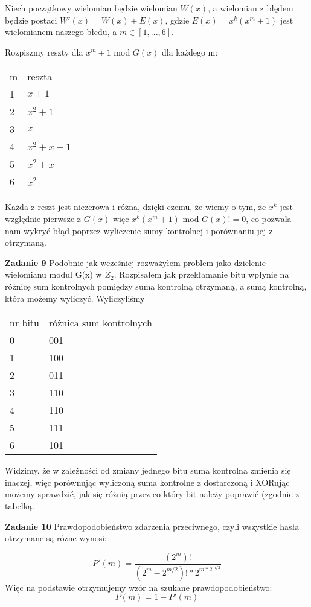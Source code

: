 \documentclass[12pt,a4paper]{article}
\newcommand{\zadanie}[1]{\par\textbf{Zadanie #1}}
\begin{document}
Niech początkowy wielomian będzie wielomian $W(x)$, a wielomian z błędem będzie postaci $W'(x) = W(x) + E(x)$, gdzie $E(x) = x^k (x^m + 1)$ jest wielomianem naszego błedu, a $m \in [1,..., 6]$.

Rozpiszmy reszty dla $x^m + 1$ mod $G(x)$ dla każdego m:

\begin{table}[h]
\begin{tabular}{ll}
m & reszta \\
1 & $x+1$ \\
2 & $x^2+1$ \\
3 & $x$ \\
4 & $x^2+x+1$ \\
5 & $x^2+x$ \\
6 & $x^2$
\end{tabular}
\end{table}

Każda z reszt jest niezerowa i różna, dzięki czemu, że wiemy o tym, że $x^k$ jest względnie pierwsze z $G(x)$ więc $x^k (x^m + 1)$ mod $G(x) != 0$, co pozwala nam wykryć błąd poprzez wyliczenie sumy kontrolnej i porównaniu jej z otrzymaną.
\newpage
\zadanie{9} Podobnie jak wcześniej rozważyłem problem jako dzielenie wielomianu modul G(x) w $Z_2$. Rozpisałem jak przekłamanie bitu wpłynie na różnicę sum kontrolnych pomiędzy suma kontrolną otrzymaną, a sumą kontrolną, która możemy wyliczyć. Wyliczyliśmy 

\begin{table}[h]
\begin{tabular}{ll}
nr bitu & różnica sum kontrolnych \\
0 & 001 \\
1 & 100 \\
2 & 011 \\
3 & 110 \\
4 & 110 \\
5 & 111 \\
6 & 101
\end{tabular}
\end{table}

Widzimy, że w zależności od zmiany jednego bitu suma kontrolna zmienia się inaczej, więc porównując wyliczoną suma kontrolne z dostarczoną i XORując możemy sprawdzić, jak się różnią przez co który bit należy poprawić (zgodnie z tabelką.
\zadanie{10}
Prawdopodobieństwo zdarzenia przeciwnego, czyli wszystkie hasła otrzymane są różne wynosi:

$$P'(m) = \frac{(2^m)!}{(2^m - 2^{m/2})!*2^{m*2^{m/2}}}$$
Więc na podstawie otrzymujemy wzór na szukane prawdopodobieństwo:
$$P(m) = 1 - P'(m)$$
\end{document}
